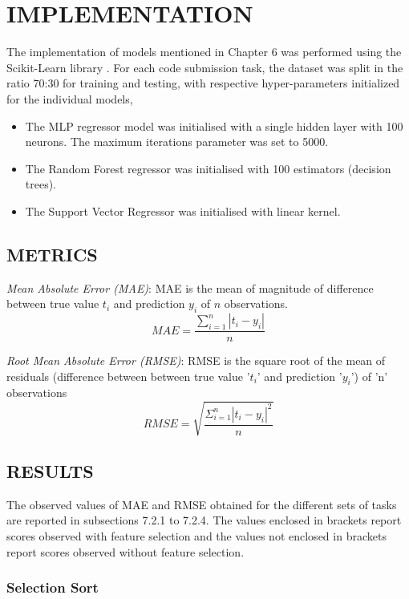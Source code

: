 \chapter{IMPLEMENTATION}

The implementation of models mentioned in Chapter 6 was performed
using the Scikit-Learn library \cite{E}. For each code submission
task, the dataset was split in the ratio 70:30 for training and
testing, with respective hyper-parameters initialized for the
individual models,

\begin{itemize}
\item The MLP regressor model was initialised with a single hidden
  layer with 100 neurons. The maximum iterations parameter was set to
  5000.
\item The Random Forest regressor was initialised with 100
  estimators (decision trees).
\item The Support Vector Regressor was initialised with linear kernel.
\end{itemize}


\section{METRICS}
 
\emph{Mean Absolute Error (MAE)}:
MAE is the mean of magnitude of difference between true value
$t_{i}$ and prediction $y_{i}$ of $n$ observations.
\[ MAE = \frac{\sum_{i=1}^{n}|t_i-y_i|}{n} \]

\emph{Root Mean Absolute Error (RMSE)}: RMSE is the square root of the
mean of residuals (difference between between true value '$t_{i}$' and
prediction '$y_{i}$') of 'n' observations
\[ RMSE = \sqrt{\frac{\Sigma_{i=1}^{n}{|t_i-y_i|}^2}{n}} \]


\section{RESULTS}

The observed values of MAE and RMSE obtained for the different sets of
tasks are reported in subsections 7.2.1 to 7.2.4. The values enclosed
in brackets report scores observed with feature selection and the
values not enclosed in brackets report scores observed without feature
selection.

\subsection{Selection Sort}

